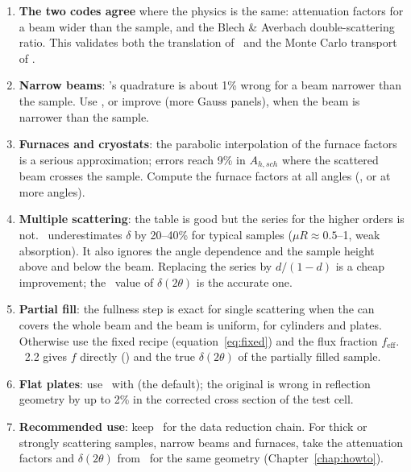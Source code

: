 \documentclass[11pt,a4paper]{report}
\begin{document}
\begin{enumerate}
  \item \textbf{The two codes agree} where the physics is the same: attenuation
        factors for a beam wider than the sample, and the Blech \& Averbach
        double-scattering ratio. This validates both the translation of \cor\ and
        the Monte Carlo transport of \mcams.
  \item \textbf{Narrow beams}: \cor's quadrature is about 1\% wrong for a beam
        narrower than the sample. Use \mcams, or improve  (more Gauss
        panels), when the beam is narrower than the sample.
  \item \textbf{Furnaces and cryostats}: the parabolic interpolation of the
        furnace factors is a serious approximation; errors reach 9\% in
        $A_{h,sch}$ where the scattered beam crosses the sample. Compute the
        furnace factors at all angles (\mcams, or  at more angles).
  \item \textbf{Multiple scattering}: the table is good but the series for the
        higher orders is not. \cor\ underestimates $\delta$ by 20--40\% for
        typical samples ($\mu R \approx 0.5$--1, weak absorption). It also
        ignores the angle dependence and the sample height above and below the
        beam. Replacing the series by $d/(1-d)$ is a cheap improvement; the
        \mcams\ value of $\delta(2\theta)$ is the accurate one.
  \item \textbf{Partial fill}: the fullness step is exact for single
        scattering when the can covers the whole beam and the beam is uniform,
        for cylinders and plates. Otherwise use the fixed recipe
        (equation~\ref{eq:fixed}) and the flux fraction $f_\mathrm{eff}$.
        \mcams~2.2 gives $f$ directly () and the
        true $\delta(2\theta)$ of the partially filled sample.
  \item \textbf{Flat plates}: use \pyc\ with  (the
        default); the original  is wrong in reflection geometry by
        up to 2\% in the corrected cross section of the test cell.
  \item \textbf{Recommended use}: keep \pyc\ for the data reduction chain. For
        thick or strongly scattering samples, narrow beams and furnaces, take the
        attenuation factors and $\delta(2\theta)$ from \mcams\ for the same
        geometry (Chapter~\ref{chap:howto}).
\end{enumerate}
\end{document}
